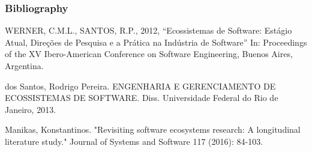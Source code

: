 \documentclass[10pt, compress,british,xcolor={svgnames,dvipsnames,x11names},trans]{beamer}
\begin{document}
\begin{frame}[allowframebreaks]
\frametitle{Bibliography}


\nocite{*}
\printbibliography[heading=none]
WERNER, C.M.L., SANTOS, R.P., 2012, “Ecossistemas de Software: Estágio Atual,
Direções de Pesquisa e a Prática na Indústria de Software” In: Proceedings of
the XV Ibero-American Conference on Software Engineering, Buenos Aires,
Argentina.

dos Santos, Rodrigo Pereira. ENGENHARIA E GERENCIAMENTO DE ECOSSISTEMAS DE SOFTWARE. Diss. Universidade Federal do Rio de Janeiro, 2013.

Manikas, Konstantinos. "Revisiting software ecosystems research: A longitudinal literature study." Journal of Systems and Software 117 (2016): 84-103.

\end{frame}
\end{document}
